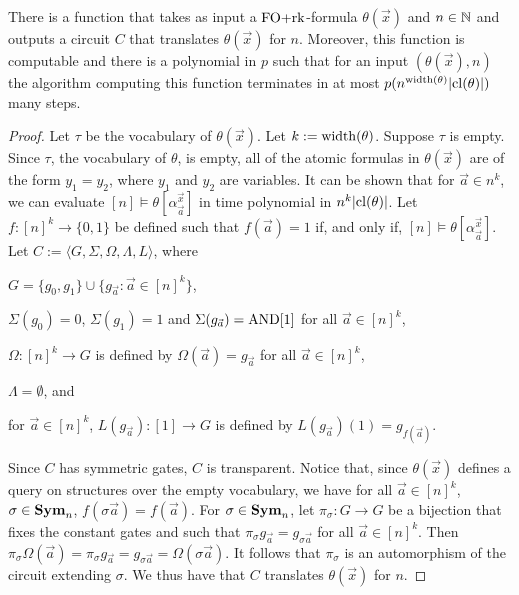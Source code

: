 \documentclass[../paper.tex]{subfiles}
\begin{document}
\begin{lem}
  There is a function that takes as input a $\text{\upshape FO+rk}$-formula $\theta(\vec{x})$
  and $n \in \mathbb{N}$ and outputs a circuit $C$ that translates $\theta(\vec{x})$
  for $n$. Moreover, this function is computable and there is a polynomial in
  $p$ such that for an input $(\theta(\vec{x}), n)$ the algorithm computing this
  function terminates in at most $p(n^{\mathrm{width}(\theta)}\vert \mathrm{cl}(\theta) \vert)$
  many steps.
  \label{lem:translating-FOrk}
\end{lem}
\begin{proof}
  Let $\tau$ be the vocabulary of $\theta(\vec{x})$. Let $k := \mathrm{width}(\theta)$.
  Suppose $\tau$ is empty. Since $\tau$, the vocabulary of $\theta$, is empty,
  all of the atomic formulas in $\theta(\vec{x})$ are of the form $y_1 = y_2$,
  where $y_1$ and $y_2$ are variables. It can be shown that for $\vec{a} \in
  n^k$, we can evaluate $[n] \models \theta[\alpha^{\vec{x}}_{\vec{a}}]$ in time
  polynomial in $n^{k} \vert \mathrm{cl}(\theta) \vert$. Let $f : [n]^k \rightarrow
  \{0,1\}$ be defined such that $f (\vec{a}) = 1$ if, and only if, $[n] \models
  \theta[\alpha^{\vec{x}}_{\vec{a}}]$. Let $C := \langle G, \Sigma, \Omega,
  \Lambda, L \rangle$, where
  \begin{myitemize}
  \item $G = \{g_0, g_1\} \cup \{g_{\vec{a}} : \vec{a} \in [n]^{k}\}$,
  \item $\Sigma (g_0) = 0$, $\Sigma (g_1) = 1$ and $\Sigma (g_{\vec{a}}) =
    \text{\upshape AND}[1]$ for all $\vec{a} \in [n]^k$,
  \item $\Omega : [n]^k \rightarrow G$ is defined by $\Omega(\vec{a}) =
    g_{\vec{a}}$ for all $\vec{a} \in [n]^k$,
  \item $\Lambda = \emptyset$, and
  \item for $\vec{a} \in [n]^k$, $L(g_{\vec{a}}) : [1] \rightarrow G$ is defined
    by $L(g_{\vec{a}})(1) = g_{f(\vec{a})}$.
  \end{myitemize}
  
  Since $C$ has symmetric gates, $C$ is transparent. Notice that, since
  $\theta(\vec{x})$ defines a query on structures over the empty vocabulary, we
  have for all $\vec{a} \in [n]^k$, $\sigma \in \text{\textbf{Sym}}_n$, $f(\sigma \vec{a}) =
  f(\vec{a})$. For $\sigma \in \text{\textbf{Sym}}_n$, let $\pi_\sigma : G \rightarrow G$ be a
  bijection that fixes the constant gates and such that $\pi_{\sigma}
  g_{\vec{a}} = g_{\sigma \vec{a}}$ for all $\vec{a} \in [n]^k$. Then
  $\pi_\sigma \Omega (\vec{a}) = \pi_\sigma g_{\vec{a}} = g_{\sigma \vec{a}} =
  \Omega (\sigma \vec{a})$. It follows that $\pi_\sigma$ is an automorphism of
  the circuit extending $\sigma$. We thus have that $C$ translates
  $\theta(\vec{x})$ for $n$.


\end{proof}
\end{document}
